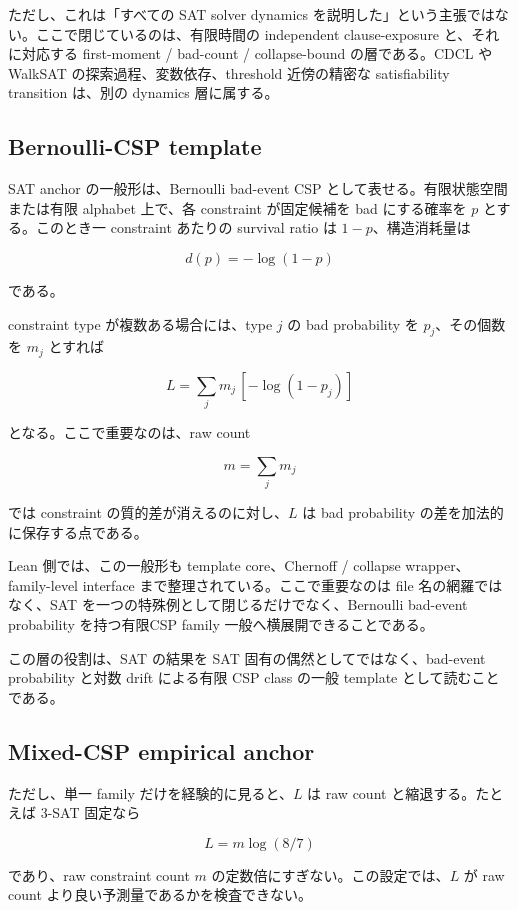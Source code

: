 \documentclass[12pt,a4paper]{article}
\begin{document}
ただし、これは「すべての SAT solver dynamics を説明した」という主張ではない。ここで閉じているのは、有限時間の independent clause-exposure と、それに対応する first-moment / bad-count / collapse-bound の層である。CDCL や WalkSAT の探索過程、変数依存、threshold 近傍の精密な satisfiability transition は、別の dynamics 層に属する。

\subsection{Bernoulli-CSP template}\label{bernoulli-csp-template}

SAT anchor の一般形は、Bernoulli bad-event CSP として表せる。有限状態空間または有限 alphabet 上で、各 constraint が固定候補を bad にする確率を \(p\) とする。このとき一 constraint あたりの survival ratio は \(1-p\)、構造消耗量は

\[
d(p)=-\log(1-p)
\]

である。

constraint type が複数ある場合には、type \(j\) の bad probability を \(p_{j}\)、その個数を \(m_{j}\) とすれば

\[
L = \sum_{j} m_{j}\,[-\log(1-p_{j})]
\]

となる。ここで重要なのは、raw count

\[
m=\sum_{j} m_{j}
\]

では constraint の質的差が消えるのに対し、\(L\) は bad probability の差を加法的に保存する点である。

Lean 側では、この一般形も template core、Chernoff / collapse wrapper、family-level interface まで整理されている。ここで重要なのは file 名の網羅ではなく、SAT を一つの特殊例として閉じるだけでなく、Bernoulli bad-event probability を持つ有限CSP family 一般へ横展開できることである。

この層の役割は、SAT の結果を SAT 固有の偶然としてではなく、bad-event probability と対数 drift による有限 CSP class の一般 template として読むことである。

\subsection{Mixed-CSP empirical anchor}\label{mixed-csp-empirical-anchor}

ただし、単一 family だけを経験的に見ると、\(L\) は raw count と縮退する。たとえば 3-SAT 固定なら

\[
L=m\log(8/7)
\]

であり、raw constraint count \(m\) の定数倍にすぎない。この設定では、\(L\) が raw count より良い予測量であるかを検査できない。
\end{document}
